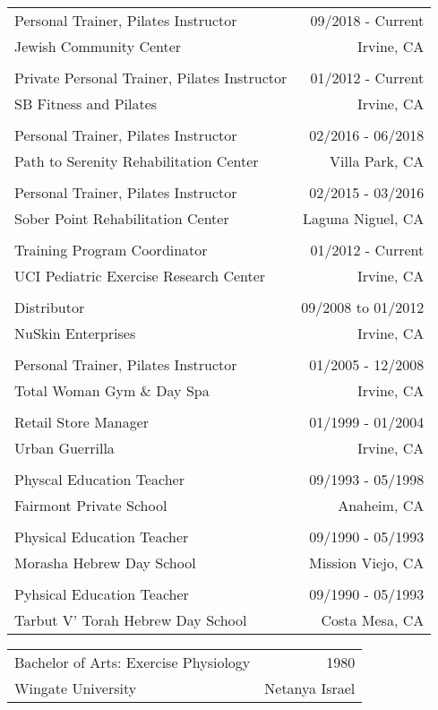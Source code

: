 \documentclass[letterpaper,10pt]{article}
\newcommand{\len}{7in}
\newcommand{\resheading}[1]{
  \colorbox{mygrey}{
    \begin{minipage}{6.9in}
      \center{\textbf{\large #1}}
    \end{minipage}
  }
}
\begin{document}
\begin{tabular*}{\len}{@{\extracolsep{\fill}}lr}
Personal Trainer, Pilates Instructor & 09/2018 - Current \\
Jewish Community Center & Irvine, CA \\
\\
Private Personal Trainer, Pilates Instructor & 01/2012 - Current \\
SB Fitness and Pilates & Irvine, CA \\
\\
Personal Trainer, Pilates Instructor & 02/2016 - 06/2018 \\
Path to Serenity Rehabilitation Center &  Villa Park, CA \\
\\
Personal Trainer, Pilates Instructor & 02/2015 - 03/2016 \\
Sober Point Rehabilitation Center & Laguna Niguel, CA \\
\\
Training Program Coordinator & 01/2012 - Current \\
UCI Pediatric Exercise Research Center & Irvine, CA \\
\\
Distributor & 09/2008 to 01/2012 \\
NuSkin Enterprises  & Irvine, CA \\
\\
Personal Trainer, Pilates Instructor & 01/2005 - 12/2008 \\
Total Woman Gym \& Day Spa & Irvine, CA \\
\\
Retail Store Manager & 01/1999 - 01/2004 \\
Urban Guerrilla & Irvine, CA \\
\\
Physcal Education Teacher & 09/1993 - 05/1998 \\
Fairmont Private School & Anaheim, CA \\
\\
Physical Education Teacher & 09/1990 - 05/1993 \\ 
Morasha Hebrew Day School & Mission Viejo, CA \\
\\
Pyhsical Education Teacher & 09/1990 - 05/1993 \\ 
Tarbut V' Torah Hebrew Day School & Costa Mesa, CA \\
\end{tabular*}
\resheading{Education}
\begin{tabular*}{\len}{@{\extracolsep{\fill}}lr}
Bachelor of Arts: Exercise Physiology & 1980 \\
Wingate University & Netanya Israel \\
\end{tabular*}
\end{document}
